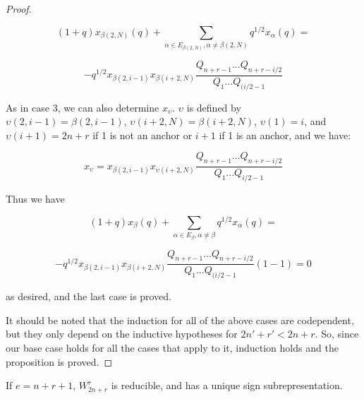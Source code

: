 \documentclass{amsart}
\begin{document}
\begin{proof}
\begin{enumerate}
	
	$$(1+q)x_{\beta(2,N)}(q)+\sum_{\alpha\in E_{\beta(2,N)},\alpha\not=\beta(2,N)}q^{1/2}x_{\alpha}(q)=$$
	
	$$-q^{1/2}x_{\beta(2,i-1)}x_{\beta(i+2,N)}\frac{Q_{n+r-1}...Q_{n+r-i/2}}{Q_1...Q_{(i/2-1}}$$
	
	As in case 3, we can also determine $x_\upsilon$. $\upsilon$ is defined by $\upsilon(2,i-1)=\beta(2,i-1)$, $\upsilon(i+2,N)=\beta(i+2,N)$, $\upsilon(1)=i$, and $\upsilon(i+1)=2n+r$ if 1 is not an anchor or $i+1$ if 1 is an anchor, and we have:
	
	$$x_\upsilon=x_{\beta(2,i-1)}x_{\upsilon(i+2,N)}\frac{Q_{n+r-1}...Q_{n+r-i/2}}{Q_1...Q_{i/2-1}}$$
	
	Thus we have
	
	$$(1+q)x_\beta(q)+\sum_{\alpha\in E_\beta,\alpha\not=\beta}q^{1/2}x_\alpha(q)=$$
	
	$$-q^{1/2}x_{\beta(2,i-1)}x_{\beta(i+2,N)}\frac{Q_{n+r-1}...Q_{n+r-i/2}}{Q_1...Q_{(i/2-1}}(1-1)=0$$
	
	as desired, and the last case is proved.
	\end{enumerate}

It should be noted that the induction for all of the above cases are codependent, but they only depend on the inductive hypotheses for $2n'+r'<2n+r$. So, since our base case holds for all the cases that apply to it, induction holds and the proposition is proved.

\end{proof}

\begin{corollary}
	If $e=n+r+1$, $W_{2n+r}^r$ is reducible, and has a unique sign subrepresentation.
\end{corollary}
\end{document}

